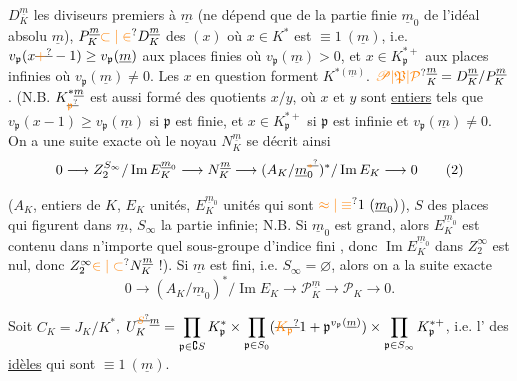 $D^{\underline m}_K$ les diviseurs premiers à $\underline m$ (ne dépend que de la partie finie $\underline m_0$ de l'idéal absolu $\underline m$), $P^{\underline m}_K\unsure{\subset|\in}D^{\underline m}_K$  des $(x)$ où $x\in K^*$ est $\equiv1\ (\underline m)$, i.e. $v_{\mathfrak p}(x\deleted{\unsure{+}}-1)\geq v_{\mathfrak p}(\underline m)$ aux places finies où $v_{\mathfrak p}(\underline m)>0$, et  $x\in K_{\mathfrak p}^{*+}$ aux places infinies où $v_{\mathfrak p}(\underline m)\neq0$. Les $x$ en question forment $K^{*(\underline m)}$. ${\unsure{\mathscr{P}|\mathfrak{P}|\mathcal{P}}}^{\underline m}_K=D^{\underline m}_K/P^{\underline m}_K$. (N.B. $K_{\deleted{\unsure{\mathfrak p}}}^{*\underline m}$ est aussi formé des quotients $x/y$, où $x$ et $y$ sont \uline{entiers} tels que $v_{\mathfrak p}(x-1)\geq v_{\mathfrak p}(\underline m)$ si $\mathfrak p$ est finie, et $x\in K_{\mathfrak p}^{*+}$ si $\mathfrak p$ est infinie et $v_{\mathfrak p}(\underline m)\neq0$. On a une suite exacte
où le noyau $N_K^{\underline m}$ se décrit ainsi
\[
0\longrightarrow Z_2^{S_\infty}/\operatorname{Im}E_K^{\underline m_0}\longrightarrow N_K^{\underline m}\longrightarrow(A_K/\underline m_0^{\deleted{\unsure{*}}})^*/\operatorname{Im}E_K\longrightarrow0
\tag*{(2)}
\]

($A_K$, entiers de $K$, $E_K$ unités, $E_K^{\underline m_0}$ unités qui sont $\unsure{\approx|\equiv}1\ (\underline m_0)$), $S$  des places qui figurent dans $\underline m$, $S_\infty$ la partie infinie; N.B. Si $\underline m_0$ est grand, alors $E_K^{\underline m_0}$ est contenu dans n'importe quel sous-groupe d'indice fini , donc $\operatorname{Im}E_K^{\underline m_0}$ dans $Z_2^\infty$ est nul, donc $Z_2^\infty\unsure{\in|\subset}N_K^{\underline m}$ !). Si $\underline m$ est fini, i.e. $S_\infty=\varnothing$, alors on a la suite exacte
\[
0\longrightarrow(A_K/\underline m_0)^*/\operatorname{Im}E_K\longrightarrow\mathscr{P}_K^{\underline m}\longrightarrow\mathscr{P}_K\longrightarrow0.
\]

Soit $C_K=J_K/K^*$, $U_K^{\deleted{\unsure{S}}\underline m}=\displaystyle\prod_{\mathfrak p\in\complement S}K_{\mathfrak p}^*\times\prod_{\mathfrak p\in S_0}(\deleted{\unsure{K_{\mathfrak p}}}1+\mathfrak p^{v_{\mathfrak p}(\underline m)})\times\prod_{\mathfrak p\in S_\infty}K_{\mathfrak p}^{*+}$, i.e.  l' des \uline{idèles} qui sont $\equiv1\ (\underline m)$.

